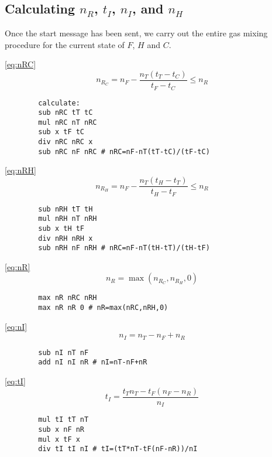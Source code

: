 \documentclass{article}
\begin{document}
\subsection{Calculating $n_R$, $t_I$, $n_I$, and $n_H$}

Once the start message has been sent, we carry out the entire
gas mixing procedure for the current state of $F$, $H$ and $C$.
\vspace{1em}
\begin{paracol}{2}
    \noindent
    \autoref{eq:nRC}
    \[
        n_{R_C} = n_F-\frac{n_T(t_T-t_C)}{t_F-t_C} \le n_R
    \]
    \switchcolumn
    \vspace{-1em}
    \begin{verbatim}
        calculate:
        sub nRC tT tC
        mul nRC nT nRC
        sub x tF tC
        div nRC nRC x
        sub nRC nF nRC # nRC=nF-nT(tT-tC)/(tF-tC)
    \end{verbatim}
    \switchcolumn*
    \noindent
    \autoref{eq:nRH}
    \[
        n_{R_H} = n_F-\frac{n_T(t_H-t_T)}{t_H-t_F} \le n_R
    \]
    \switchcolumn
    \vspace{-1em}
    \begin{verbatim}
        sub nRH tT tH
        mul nRH nT nRH
        sub x tH tF
        div nRH nRH x
        sub nRH nF nRH # nRC=nF-nT(tH-tT)/(tH-tF)
    \end{verbatim}
    \switchcolumn*
    \noindent
    \autoref{eq:nR}
    \[
        n_R = \max(n_{R_C},n_{R_H},0)
    \]
    \switchcolumn
    \vspace{-1em}
    \begin{verbatim}
        max nR nRC nRH
        max nR nR 0 # nR=max(nRC,nRH,0)
    \end{verbatim}
    \switchcolumn*
    \noindent
    \autoref{eq:nI}
    \[
        n_I = n_T-n_F+n_R
    \]
    \switchcolumn
    \vspace{-1em}
    \begin{verbatim}
        sub nI nT nF
        add nI nI nR # nI=nT-nF+nR
    \end{verbatim}
    \switchcolumn*
    \noindent
    \autoref{eq:tI}
    \[
        t_I = \frac{t_T n_T-t_F(n_F-n_R)}{n_I}
    \]
    \switchcolumn
    \vspace{-1em}
    \begin{verbatim}
        mul tI tT nT
        sub x nF nR
        mul x tF x
        div tI tI nI # tI=(tT*nT-tF(nF-nR))/nI
    \end{verbatim}

\end{paracol}
\end{document}
